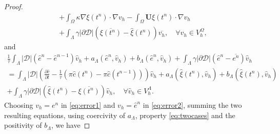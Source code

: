 \documentclass[pdflatex,sn-mathphys-num]{sn-jnl}%
\newcommand{\bfU}{{\boldsymbol U}}
\theoremstyle{thmstyleone}%
\theoremstyle{thmstyletwo}%
\theoremstyle{thmstylethree}%
\begin{document}
\begin{proof}
\begin{align}
      +   \int_\Omega  \kappa \nabla \xi(t^{n}) \cdot \nabla v_h
      - \int_\Omega \bfU \xi(t^{n}) \cdot \nabla v_h\nonumber\\
      +\int_\Lambda\gamma \vert \partial\mathcal{D}\vert \left(\overline{\xi(t^{n})}-\hat{\xi}(t^{n})\right)\overline{v_h},\quad\forall v_h \in V_h^\Omega,
\label{eq:error1}
\end{align}
and
\begin{align}
    \frac{1}{\tau} \int_\Lambda |\mathcal{D}|(\hat e^{n}- \hat e^{n-1}) \hat v_h
    + a_\Lambda(\hat e^{n}, \hat v_h)
    + b_\Lambda(\hat e^{n}, \hat v_h)
    +\int_\Lambda \gamma|\partial\mathcal{D}|\left(\hat e^{n}-\overline{e^{n}}\right)   \hat v_h\nonumber\\
= \int_\Lambda |\mathcal{D}| \left( \frac{\partial \hat c}{\partial t} - \frac{1}{\tau} (\pi \hat c(t^n) - \pi\hat c(t^{n-1}))\right) \hat v_h
    + a_\Lambda(\hat \xi(t^{n}), \hat v_h)
    + b_\Lambda(\hat \xi(t^{n}), \hat v_h)\nonumber\\
    +\int_\Lambda \gamma|\partial\mathcal{D}|\left(\hat \xi(t^{n})-\overline{\xi(t^{n})}\right)   \hat v_h, \quad \forall \hat v_h \in V_h^\Lambda.
\label{eq:error2}
\end{align}
Choosing $v_h = e^n$ in \eqref{eq:error1} and $v_h = \hat e^n$ in \eqref{eq:error2}, summing the two resulting equations, using coercivity of $a_\Lambda$, property \eqref{eq:twocases} and the positivity of $b_\Lambda$, we have

\end{proof}
\end{document}

